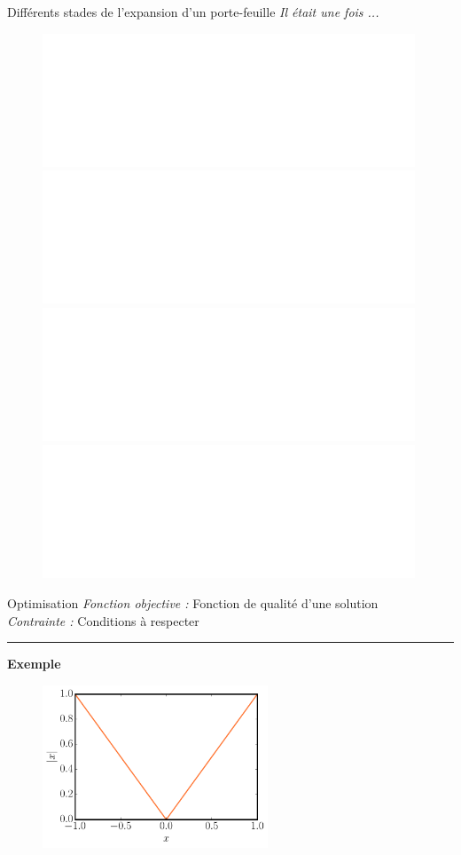 \begin{frame}{Différents stades de l'expansion d'un porte-feuille}
  \textit{Il était une fois ...}
  \begin{figure}[tb]
    \centering
    \includegraphics<1>[width=0.99\textwidth]{figures/schema_optimisation0.pdf}
    \includegraphics<2>[width=0.99\textwidth]{figures/schema_optimisation1.pdf}
    \includegraphics<3>[width=0.99\textwidth]{figures/schema_optimisation2.pdf}
    \includegraphics<4>[width=0.99\textwidth]{figures/schema_optimisation3.pdf}
  \end{figure} 
\end{frame}

\begin{frame}{Optimisation}
\vspace{-10pt}
\textit{Fonction objective : } Fonction de qualité d'une solution\\
\textit{Contrainte : } Conditions à respecter\\ 
\vspace{0.4cm}
\hrule
\vspace{0.3cm}
\pause
\textbf{Exemple}
  \begin{figure}[h!]
    \centering
    \includegraphics[width=0.60\textwidth]{figures/absolute_function.pdf}
  \end{figure}
\end{frame}